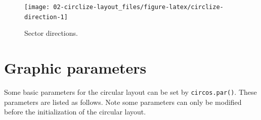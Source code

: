 \documentclass[]{book}
\begin{document}
\begin{figure}

{\centering \texttt{[image: 02-circlize-layout\_files/figure-latex/circlize-direction-1]} 

}

\caption{Sector directions.}\label{fig:circlize-direction}
\end{figure}

\section{Graphic parameters}\label{graphic-parameters}

Some basic parameters for the circular layout can be set by
\texttt{circos.par()}. These parameters are listed as follows. Note some
parameters can only be modified before the initialization of the
circular layout.
\end{document}
